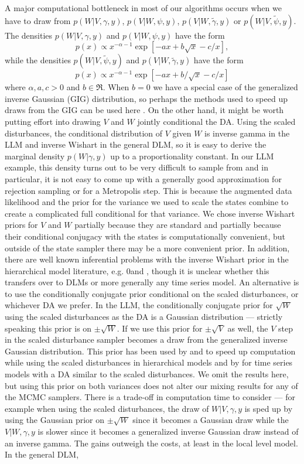 \documentclass[12pt]{article}
\newcommand{\blind}{0} %
\begin{document}
A major computational bottleneck in most of our algorithms occurs when we have to draw from $p(W|V,\gamma,y)$, $p(V|W,\psi,y)$, $p(V|W,\tilde{\gamma},y)$ or $p(W|V,\tilde{\psi},y)$. The densities $p(W|V,\gamma,y)$ and $p(V|W,\psi,y)$ have the form
\[
p(x)\propto x^{-\alpha-1}\exp\left[-ax + b\sqrt{x} - c/x\right],
\]
while the densities $p(W|V,\tilde{\psi},y)$ and $p(V|W,\tilde{\gamma},y)$ have the form
\[
p(x)\propto x^{-\alpha-1}\exp\left[ -ax + b/\sqrt{x} -c/x\right]
\]
where $\alpha,a,c>0$ and $b\in\Re$. When $b=0$ we have a special case of the generalized inverse Gaussian (GIG) distribution, so perhaps the methods used to speed up draws from the GIG can be used here \citep{jorgensen1982statistical,dagpunar1989easily,devroye2012random}. On the other hand, it might be worth putting effort into drawing $V$ and $W$ jointly conditional the DA. Using the scaled disturbances, the conditional distribution of $V$ given $W$ is inverse gamma in the LLM and inverse Wishart in the general DLM, so it is easy to derive the marginal density $p(W|\gamma,y)$ up to a proportionality constant. In our LLM example, this density turns out to be very difficult to sample from and in particular, it is not easy to come up with a generally good approximation for rejection sampling or for a Metropolis step. This is because the augmented data likelihood and the prior for the variance we used to scale the states combine to create a complicated full conditional for that variance. We chose inverse Wishart priors for $V$ and $W$ partially because they are standard and partially because their conditional conjugacy with the states is computationally convenient, but outside of the state sampler there may be a more convenient prior. In addition, there are well known inferential problems with the inverse Wishart prior in the hierarchical model literature, e.g. \citet{gelman2006prior}\blind and \citet{alvarez2014cov}\fi, though it is unclear whether this transfers over to DLMs or more generally any time series model. An alternative is to use the conditionally conjugate prior conditional on the scaled disturbances, or whichever DA we prefer. In the LLM, the conditionally conjugate prior for $\sqrt{W}$ using the scaled disturbances as the DA is a Gaussian distribution --- strictly speaking this prior is on $\pm \sqrt{W}$. If we use this prior for $\pm\sqrt{V}$ as well, the $V$ step in the scaled disturbance sampler becomes a draw from the generalized inverse Gaussian distribution. This prior has been used by \citet{fruhwirth2011bayesian} and \citet{fruhwirth2008bayesian} to speed up computation while using the scaled disturbances in hierarchical models and by \citet{fruhwirth2010stochastic} for time series models with a DA similar to the scaled disturbances. We omit the results here, but using this prior on both variances does not alter our mixing results for any of the MCMC samplers. There is a trade-off in computation time to consider --- for example when using the scaled disturbances, the draw of $W|V,\gamma,y$ is sped up by using the Gaussian prior on $\pm\sqrt{W}$ since it becomes a Gaussian draw while the $V|W,\gamma,y$ is slower since it becomes a generalized inverse Gaussian draw instead of an inverse gamma. The gains outweigh the costs, at least in the local level model. In the general DLM, 
\end{document}
